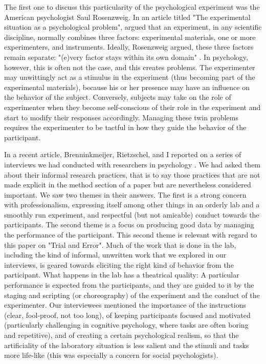 \documentclass[twocolumn, serif, authordate, reflection]{jote-article}
\begin{document}
The first one to discuss this particularity of the psychological experiment was the American psychologist Saul Rosenzweig. In an article titled "The experimental situation as a psychological problem", \textcite{Rosenzweig1933} argued that an experiment, in any scientific discipline, normally combines three factors: experimental materials, one or more experimenters, and instruments. Ideally, Rosenzweig argued, these three factors remain separate: "(e)very factor stays within its own domain" \parencite[p.338]{Rosenzweig1933}. In psychology, however, this is often not the case, and this creates problems. The experimenter may unwittingly act as a stimulus in the experiment (thus becoming part of the experimental materials), because his or her presence may have an influence on the behavior of the subject. Conversely, subjects may take on the role of experimenter when they become self-conscious of their role in the experiment and start to modify their responses accordingly. Managing these twin problems requires the experimenter to be tactful in how they guide the behavior of the participant.

In a recent article, Brenninkmeijer, Rietzschel, and I reported on a series of interviews we had conducted with researchers in psychology  \parencite{Brenninkmeijer2019}. We had asked them about their informal research practices, that is to say those practices that are not made explicit in the method section of a paper but are nevertheless considered important. We saw two themes in their answers. The first is a strong concern with professionalism, expressing itself among other things in an orderly lab and a smoothly run experiment, and respectful (but not amicable) conduct towards the participants. The second theme is a focus on producing good data by managing the performance of the participant. This second theme is relevant with regard to this paper on "Trial and Error". Much of the work that is done in the lab, including the kind of informal, unwritten work that we explored in our interviews, is geared towards eliciting the right kind of behavior from the participant. What happens in the lab has a theatrical quality: A particular performance is expected from the participants, and they are guided to it by the staging and scripting (or choreography) of the experiment and the conduct of the experimenter. Our interviewees mentioned the importance of the instructions (clear, fool-proof, not too long), of keeping participants focused and motivated (particularly challenging in cognitive psychology, where tasks are often boring and repetitive), and of creating a certain psychological realism, so that the artificiality of the laboratory situation is less salient and the stimuli and tasks more life-like (this was especially a concern for social psychologists).
\end{document}
